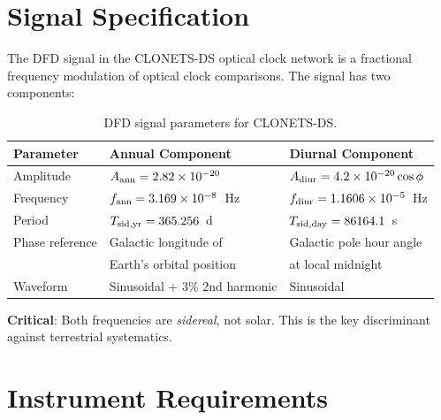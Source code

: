 \documentclass[11pt]{article}
\newcommand{\ee}[1]{\times 10^{#1}}
\begin{document}
\section{Signal Specification}
\label{sec:signal-spec}

The DFD signal in the CLONETS-DS optical clock network is a fractional
frequency modulation of optical clock comparisons. The signal has two
components:

\begin{table}[H]
\centering
\caption{DFD signal parameters for CLONETS-DS.}
\begin{tabular}{lll}
\toprule
\textbf{Parameter} & \textbf{Annual Component} & \textbf{Diurnal Component} \\
\midrule
Amplitude & $A_{\rm ann} = 2.82\ee{-20}$ & $A_{\rm diur} = 4.2\ee{-20}\cos\phi$ \\
Frequency & $f_{\rm ann} = 3.169\ee{-8}$~Hz & $f_{\rm diur} = 1.1606\ee{-5}$~Hz \\
Period & $T_{\rm sid,yr} = 365.256$~d & $T_{\rm sid,day} = 86164.1$~s \\
Phase reference & Galactic longitude of & Galactic pole hour angle \\
 & Earth's orbital position & at local midnight \\
Waveform & Sinusoidal + $3\%$ 2nd harmonic & Sinusoidal \\
\bottomrule
\end{tabular}
\end{table}

\textbf{Critical}: Both frequencies are \emph{sidereal}, not solar.
This is the key discriminant against terrestrial systematics.

\section{Instrument Requirements}
\label{sec:instrument-req}
\end{document}
